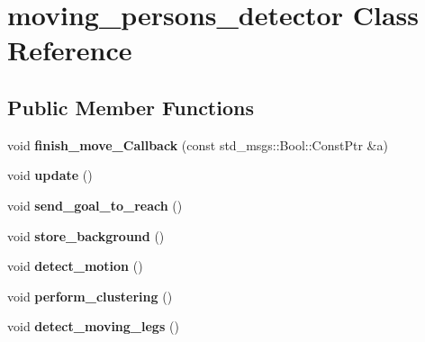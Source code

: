 \hypertarget{classmoving__persons__detector}{}\section{moving\+\_\+persons\+\_\+detector Class Reference}
\label{classmoving__persons__detector}
\subsection*{Public Member Functions}
\begin{DoxyCompactItemize}
\item 
void {\bfseries finish\+\_\+move\+\_\+\+Callback} (const std\+\_\+msgs\+::\+Bool\+::\+Const\+Ptr \&a)\hypertarget{classmoving__persons__detector_ab65c437e215fbad7e8a190a3ac424a9c}{}\label{classmoving__persons__detector_ab65c437e215fbad7e8a190a3ac424a9c}

\item 
void {\bfseries update} ()\hypertarget{classmoving__persons__detector_a22fd235d29f4a41b4e7904b76738baed}{}\label{classmoving__persons__detector_a22fd235d29f4a41b4e7904b76738baed}

\item 
void {\bfseries send\+\_\+goal\+\_\+to\+\_\+reach} ()\hypertarget{classmoving__persons__detector_ac80c809c589313490eb280cbce223228}{}\label{classmoving__persons__detector_ac80c809c589313490eb280cbce223228}

\item 
void {\bfseries store\+\_\+background} ()\hypertarget{classmoving__persons__detector_ac0ecfeda0495b2ba7f7004851fd67e82}{}\label{classmoving__persons__detector_ac0ecfeda0495b2ba7f7004851fd67e82}

\item 
void {\bfseries detect\+\_\+motion} ()\hypertarget{classmoving__persons__detector_ab556a848049a07681112fc60aac58bda}{}\label{classmoving__persons__detector_ab556a848049a07681112fc60aac58bda}

\item 
void {\bfseries perform\+\_\+clustering} ()\hypertarget{classmoving__persons__detector_a5ecb03bfa3c5fffbdd16da4ed7a255d8}{}\label{classmoving__persons__detector_a5ecb03bfa3c5fffbdd16da4ed7a255d8}

\item 
void {\bfseries detect\+\_\+moving\+\_\+legs} ()\hypertarget{classmoving__persons__detector_a53e036c28def16757dac2850231ed614}{}\label{classmoving__persons__detector_a53e036c28def16757dac2850231ed614}


\end{DoxyCompactItemize}
